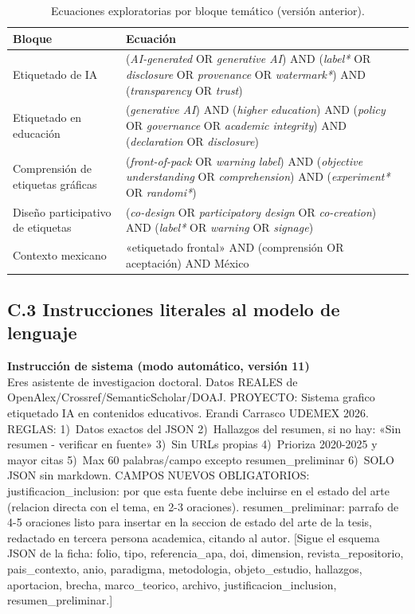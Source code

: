 \documentclass[letter,12pt]{article}
\begin{document}
\begin{table}[H]
\centering
\footnotesize
\caption{Ecuaciones exploratorias por bloque temático (versión anterior).}
\label{tab:ecuaciones}
\renewcommand{\arraystretch}{1.35}
\begin{tabular}{|p{3.0cm}|p{9.4cm}|}
\hline
\rowcolor{bgCotejo}
\textbf{Bloque} & \textbf{Ecuación} \\
\hline
Etiquetado de IA & (\textit{AI-generated} OR \textit{generative AI}) AND (\textit{label*} OR \textit{disclosure} OR \textit{provenance} OR \textit{watermark*}) AND (\textit{transparency} OR \textit{trust}) \\
\hline
Etiquetado en educación & (\textit{generative AI}) AND (\textit{higher education}) AND (\textit{policy} OR \textit{governance} OR \textit{academic integrity}) AND (\textit{declaration} OR \textit{disclosure}) \\
\hline
Comprensión de etiquetas gráficas & (\textit{front-of-pack} OR \textit{warning label}) AND (\textit{objective understanding} OR \textit{comprehension}) AND (\textit{experiment*} OR \textit{randomi*}) \\
\hline
Diseño participativo de etiquetas & (\textit{co-design} OR \textit{participatory design} OR \textit{co-creation}) AND (\textit{label*} OR \textit{warning} OR \textit{signage}) \\
\hline
Contexto mexicano & «etiquetado frontal» AND (comprensión OR aceptación) AND México \\
\hline
\end{tabular}
\end{table}

\subsection*{C.3 Instrucciones literales al modelo de lenguaje}

\begin{mdframed}[style=cajaCotejo]
\textbf{\textcolor{colorCotejo}{Instrucción de sistema (modo automático, versión 11)}}\\[4pt]
\footnotesize
Eres asistente de investigacion doctoral. Datos REALES de OpenAlex/Crossref/SemanticScholar/DOAJ. PROYECTO: Sistema grafico etiquetado IA en contenidos educativos. Erandi Carrasco UDEMEX 2026. REGLAS: 1)~Datos exactos del JSON 2)~Hallazgos del resumen, si no hay: «Sin resumen - verificar en fuente» 3)~Sin URLs propias 4)~Prioriza 2020-2025 y mayor citas 5)~Max 60 palabras/campo excepto resumen\_preliminar 6)~SOLO JSON sin markdown. CAMPOS NUEVOS OBLIGATORIOS: justificacion\_inclusion: por que esta fuente debe incluirse en el estado del arte (relacion directa con el tema, en 2-3 oraciones). resumen\_preliminar: parrafo de 4-5 oraciones listo para insertar en la seccion de estado del arte de la tesis, redactado en tercera persona academica, citando al autor. [Sigue el esquema JSON de la ficha: folio, tipo, referencia\_apa, doi, dimension, revista\_repositorio, pais\_contexto, anio, paradigma, metodologia, objeto\_estudio, hallazgos, aportacion, brecha, marco\_teorico, archivo, justificacion\_inclusion, resumen\_preliminar.]
\end{mdframed}
\end{document}
